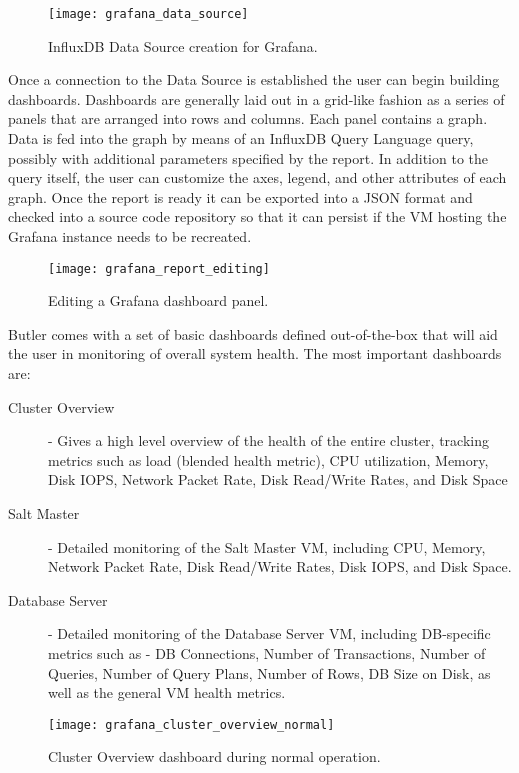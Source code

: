 \begin{figure}[h]
\texttt{[image: grafana\_data\_source]}
\centering
\caption {InfluxDB Data Source creation for Grafana.}
\label{fig:grafana_data_source}
\end{figure}

Once a connection to the Data Source is established the user can begin building dashboards. Dashboards are generally laid out in a grid-like fashion as a series of panels that are arranged into rows and columns. Each panel contains a graph. Data is fed into the graph by means of an InfluxDB Query Language query, possibly with additional parameters specified by the report.  In addition to the query itself, the user can customize the axes, legend, and other attributes of each graph. Once the report is ready it can be exported into a JSON format and checked into a source code repository so that it can persist if the VM hosting the Grafana instance needs to be recreated.

\begin{figure}[h]
\texttt{[image: grafana\_report\_editing]}
\centering
\caption {Editing a Grafana dashboard panel.}
\label{fig:grafana_report_editing}
\end{figure}

Butler comes with a set of basic dashboards defined out-of-the-box that will aid the user in monitoring of overall system health. The most important dashboards are:

\begin{description}
\item [Cluster Overview] - Gives a high level overview of the health of the entire cluster, tracking metrics such as load (blended health metric), CPU utilization, Memory, Disk IOPS, Network Packet Rate, Disk Read/Write Rates, and Disk Space
\item [Salt Master] - Detailed monitoring of the Salt Master VM, including CPU, Memory, Network Packet Rate, Disk Read/Write Rates, Disk IOPS, and Disk Space.
\item [Database Server] - Detailed monitoring of the Database Server VM, including DB-specific metrics such as - DB Connections, Number of Transactions, Number of Queries, Number of Query Plans, Number of Rows, DB Size on Disk, as well as the general VM health metrics.
\end{description}

\begin{figure}[h]
\texttt{[image: grafana\_cluster\_overview\_normal]}
\centering
\caption {Cluster Overview dashboard during normal operation.}
\label{fig:grafana_cluster_overview_normal}
\end{figure}

